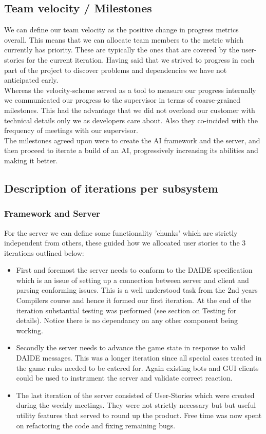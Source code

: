 \documentclass[11pt]{article}
\begin{document}
\subsection{Team velocity / Milestones}
We can define our team velocity as the positive change in progress metrics overall. 
This means that we can allocate team members to the metric which currently has 
priority. These are typically the ones that are covered by the user-stories for
the current iteration. Having said that we strived to progress in each part
of the project to discover problems and dependencies we have not anticipated
early. 
\\
Whereas the velocity-scheme served as a tool to measure our progress internally
we communicated our progress to the supervisor in terms of coarse-grained 
milestones. This had the advantage that we did not overload our customer with
technical details only we as developers care about. Also they co-incided with
the frequency of meetings with our supervisor. 
\\
The milestones agreed upon were to create the AI framework and the
server, and then proceed to iterate a build of an AI, progressively increasing
its abilities and making it better. 

\subsection{Description of iterations per subsystem}

\subsubsection{Framework and Server}

For the server we can define some functionality 'chunks' which are strictly 
independent from others, these guided how we allocated user stories to the
3 iterations outlined below:

\begin{itemize}
\item First and foremost the server needs to conform to the DAIDE specification which
      is an issue of setting up a connection between server and client and parsing
      conforming issues. This is a well understood task from the 2nd years Compilers
      course and hence it formed our first iteration. At the end of the iteration
      substantial testing was performed (see section on Testing for details). Notice
      there is no dependancy on any other component being working.
\item Secondly the server needs to advance the game state in response to valid
      DAIDE messages. This was a longer iteration since all special cases 
      treated in the game rules needed to be catered for. Again existing bots and
      GUI clients could be used to instrument the server and validate correct
      reaction.
\item The last iteration of the server consisted of User-Stories which were 
      created during the weekly meetings. They were not strictly necessary but
      but useful utility features that served to round up the product. Free time
      was now spent on refactoring the code and fixing remaining bugs.
\end{itemize}
\end{document}
